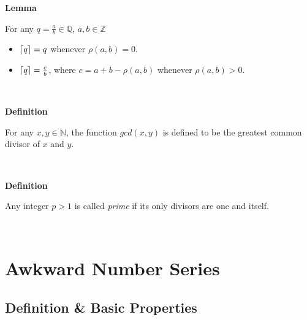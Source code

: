 \documentclass[a4paper,12pt]{article}
\DeclarePairedDelimiter{\ceil}{\lceil}{\rceil}
\begin{document}
\label{lemma:ceiling_function}
\hypertarget{lemma:ceiling_function}{}
\begin{tcolorbox}
\textbf{Lemma}

\noindent For any $q = \frac{a}{b} \in \mathbb{Q}$, $a, b \in \mathbb{Z}$

\begin{itemize}
\item $\ceil{q} = q$ whenever $\rho(a, b) = 0$.

\item  $\ceil{q} = \frac{c}{b}$, where $c = a + b - \rho(a, b)$ whenever $\rho(a, b) > 0$.
\end{itemize}


\end{tcolorbox}
\noindent \\








\label{definition:gcd}
\hypertarget{definition:gcd}{}
\begin{tcolorbox}
\textbf{Definition}

\noindent For any $x, y \in \mathbb{N}$, the function $gcd(x, y)$ is defined to be the greatest common divisor of $x$ and $y$.
\end{tcolorbox}
\noindent \\








\label{definition:prime_numbers}
\hypertarget{definition:prime_numbers}{}
\begin{tcolorbox}
\textbf{Definition}

\noindent Any integer $p > 1$ is called \textit{prime} if its only divisors are one and itself.

\end{tcolorbox}
\noindent \\









\section{Awkward Number Series}
\label{section:awkward_number_series}


\subsection{Definition \& Basic Properties}
\end{document}

